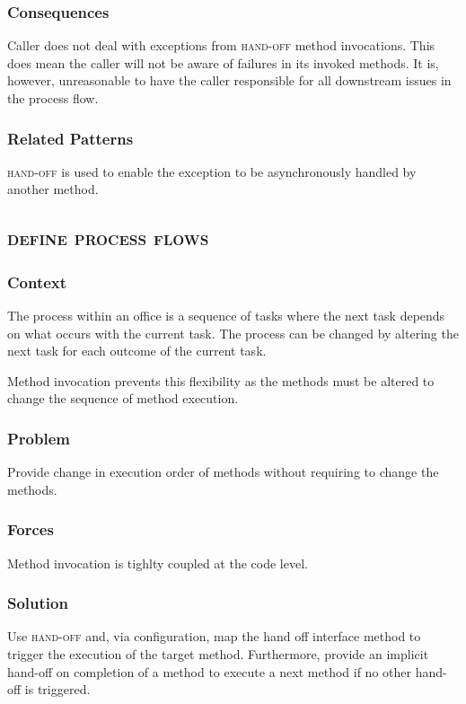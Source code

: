 \documentclass[prodmode]{style/acmlarge}
\begin{document}
\subsubsection*{Consequences} Caller does not deal with exceptions from
\textsc{hand-off} method invocations.  This does mean the caller will not be
aware of failures in its invoked methods.  It is, however, unreasonable to have
the caller responsible for all downstream issues in the process flow.

\subsubsection*{Related Patterns} \textsc{hand-off} is used to enable the
exception to be asynchronously handled by another method.



\subsection{\textsc{\textbf{define process flows}}}

\subsubsection*{Context} The process within an office is a sequence of tasks
where the next task depends on what occurs with the current task.  The process
can be changed by altering the next task for each outcome of the current task.

Method invocation prevents this flexibility as the methods must be altered to
change the sequence of method execution.

\subsubsection*{Problem} Provide change in execution order of methods without
requiring to change the methods.

\subsubsection*{Forces} Method invocation is tighlty coupled at the code level.

\subsubsection*{Solution} Use \textsc{hand-off} and, via configuration, map the
hand off interface method to trigger the execution of the target method. 
Furthermore, provide an implicit hand-off on completion of a method to execute a
next method if no other hand-off is triggered.
\end{document}
